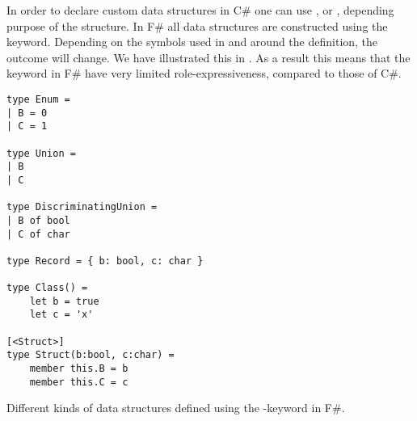 In order to declare custom data structures in C\# one can use ,  or , depending purpose of the structure. In F\# all data structures are constructed using the  keyword. Depending on the symbols used in and around the definition, the outcome will change. We have illustrated this in . As a result this means that the  keyword in F\# have very limited role-expressiveness, compared to those of C\#.

\begin{listing}
    \begin{verbatim}
type Enum =
| B = 0
| C = 1

type Union =
| B
| C

type DiscriminatingUnion =
| B of bool
| C of char

type Record = { b: bool, c: char }

type Class() =
    let b = true
    let c = 'x'

[<Struct>]
type Struct(b:bool, c:char) =
    member this.B = b
    member this.C = c
    \end{verbatim}
    \caption{Different kinds of data structures defined using the -keyword in F\#.}
    \label{lst:fsharp:type}
\end{listing}
